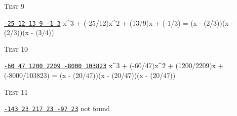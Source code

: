 \textsc{Test 9}
\begin{console}[commandchars=\\\{\}]
\underline{\texttt{-25 12 13 9 -1 3}}
x^3 + (-25/12)x^2 + (13/9)x + (-1/3) = (x - (2/3))(x - (2/3))(x - (3/4))
\end{console}


\textsc{Test 10}
\begin{console}[fontsize=\scriptsize,commandchars=\\\{\}]
\underline{\texttt{-60 47 1200 2209 -8000 103823}}
x^3 + (-60/47)x^2 + (1200/2209)x + (-8000/103823) = (x - (20/47))(x - (20/47))(x - (20/47))
\end{console}

\textsc{Test 11}
\begin{console}[commandchars=\\\{\}]
\underline{\texttt{-143 23 217 23 -97 23}}
not found
\end{console}
